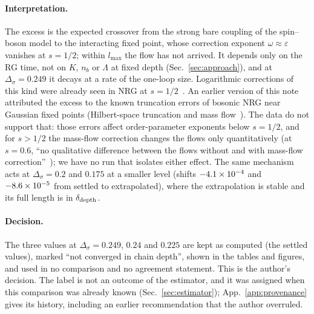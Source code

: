 \documentclass[10pt,a4paper]{article}
\newcommand{\Ds}{\Delta_\sigma}
\newcommand{\dd}{\delta_{\rm depth}}
\begin{document}
\paragraph{Interpretation.} The excess is the expected crossover from the strong bare coupling of the spin--boson model to the
interacting fixed point, whose correction exponent $\omega\approx\varepsilon$ vanishes at $s=1/2$; within $l_{\max}$ the flow has not
arrived. It depends only on the RG time, not on $K$, $n_b$ or $\Lambda$ at fixed depth (Sec.~\ref{sec:approach}), and at
$\Ds=0.249$ it decays at a rate of the one-loop size. Logarithmic corrections of this kind were already seen in NRG at $s=1/2$~\cite{Vojta2005}.
An earlier version of this note attributed the excess to the known truncation errors of bosonic NRG near Gaussian fixed points
(Hilbert-space truncation and mass flow~\cite{Vojta2005,Vojta2010,Vojta2012}). The data do not support that: those errors affect
order-parameter exponents below $s=1/2$, and for $s>1/2$ the mass-flow correction changes the flows only quantitatively
(at $s=0.6$, ``no qualitative difference between the flows without and with mass-flow correction''~\cite{Vojta2010}); we have no run
that isolates either effect. The same mechanism acts at $\Ds=0.2$ and $0.175$ at a smaller level (shifts $-4.1\times10^{-4}$ and
$-8.6\times10^{-5}$ from settled to extrapolated), where the extrapolation is stable and its full length is in $\dd$.

\paragraph{Decision.} The three values at $\Ds=0.249$, $0.24$ and $0.225$ are kept as computed (the settled values), marked ``not
converged in chain depth'', shown in the tables and figures, and used in no comparison and no agreement statement. This is the
author's decision. The label is not an outcome of the estimator, and it was assigned when this comparison was already known
(Sec.~\ref{sec:estimator}); App.~\ref{app:provenance} gives its history, including an earlier recommendation that the author
overruled.

\begin{table}[ht]\centering\scriptsize\setlength{\tabcolsep}{3pt}
\caption{NRG against the $\varepsilon$ series near $s=1/2$. Optimal truncation with its smallest term; Borel--Pad\'e central value with
the spread over approximants; NRG minus the reference (the partial sum at $\Ds=0.249$, the Borel--Pad\'e sum otherwise; at $\Ds=0.2$
this difference is not meaningful, see text); the range of the rule's extrapolations and the crossover fit of
Sec.~\ref{sec:crosscheck} (cross-checks, not adopted). Bracketed: settled values not converged in chain depth, not used.}\label{tab:series}

\end{table}
\end{document}
